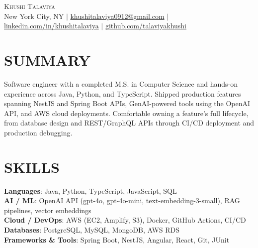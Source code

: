 \documentclass[letterpaper,11pt]{article}
\begin{document}
\begin{center}
    {\Huge \scshape Khushi Talaviya} \\ \vspace{2pt}
    \vspace{4pt}
    \small
    New York City, NY $|$
    \href{mailto:khushitalaviya0912@gmail.com}{khushitalaviya0912@gmail.com} $|$
    \href{https://www.linkedin.com/in/khushitalaviya/}{linkedin.com/in/khushitalaviya} $|$
    \href{https://github.com/talaviyakhushi}{github.com/talaviyakhushi}
\end{center}

\section{SUMMARY}
\vspace{5pt}
\small{Software engineer with a completed M.S. in Computer Science and hands-on experience across Java, Python, and TypeScript. Shipped production features spanning NestJS and Spring Boot APIs, GenAI-powered tools using the OpenAI API, and AWS cloud deployments. Comfortable owning a feature's full lifecycle, from database design and REST/GraphQL APIs through CI/CD deployment and production debugging.}

\vspace{2pt}
\section{SKILLS}
\vspace{5pt}
\begin{itemize}[leftmargin=0in, label={}]
\small{\item{
\textbf{Languages}{: Java, Python, TypeScript, JavaScript, SQL} \\
\textbf{AI / ML}{: OpenAI API (gpt-4o, gpt-4o-mini, text-embedding-3-small), RAG pipelines, vector embeddings} \\
\textbf{Cloud / DevOps}{: AWS (EC2, Amplify, S3), Docker, GitHub Actions, CI/CD} \\
\textbf{Databases}{: PostgreSQL, MySQL, MongoDB, AWS RDS} \\
\textbf{Frameworks \& Tools}{: Spring Boot, NestJS, Angular, React, Git, JUnit}
}}
\end{itemize}
\vspace{-10pt}

\end{document}
